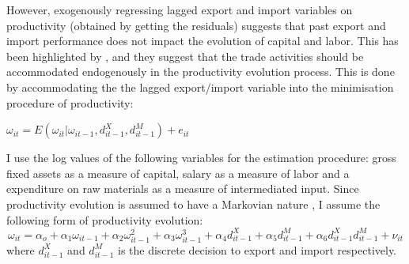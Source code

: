 \documentclass[12pt]{article}
\begin{document}
However, exogenously regressing lagged  export and import variables  on
productivity (obtained by getting the residuals) suggests that past
export and import performance does not impact the evolution of
capital and labor. This has been highlighted by \textcite{de2013detecting}, and
they suggest that the trade activities should be accommodated
endogenously in the productivity evolution process. This is done by
accommodating the the lagged export/import variable into the
minimisation procedure of productivity:

$\omega_{it} =
  E(\omega_{it}|\omega_{it-1}, d_{it-1}^{X}, d_{it-1}^{M}) + e_{it}$





I use the log values of the following variables for the estimation
procedure:  gross fixed assets as a measure of capital, salary
as a measure of labor and a expenditure on raw materials as a measure
of intermediated input. Since productivity evolution is  assumed to
have a Markovian nature , I assume the following form of productivity
evolution:
\begin{equation}
 \omega_{it} = \alpha_{o} + \alpha_{1}\omega_{it-1} +
\alpha_{2}\omega_{it-1}^{2} + \alpha_{3}\omega_{it-1}^{3}+
\alpha_{4}d_{it-1}^{X} + \alpha_{5} d_{it-1}^{M} +
\alpha_{6}d_{it-1}^{X}d_{it-1}^{M}  + \nu_{it}
\end{equation} 
where $d_{it-1}^{X}$ and $d_{it-1}^{M}$ is the discrete decision to
export and import respectively. 
\end{document}
